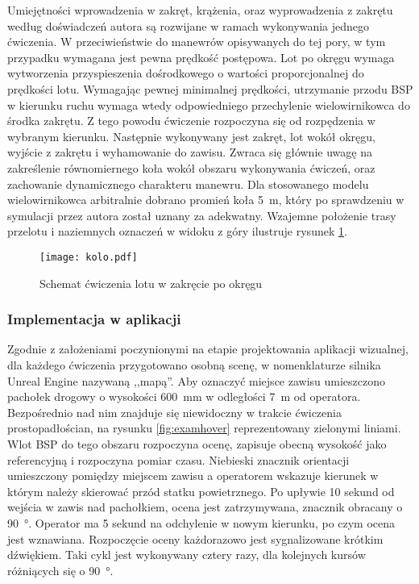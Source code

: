Umiejętności wprowadzenia w zakręt, krążenia, oraz wyprowadzenia z zakrętu według doświadczeń autora są rozwijane w ramach wykonywania jednego ćwiczenia. W przeciwieństwie do manewrów opisywanych do tej pory, w tym przypadku wymagana jest pewna prędkość postępowa. Lot po okręgu wymaga wytworzenia przyspieszenia dośrodkowego o wartości proporcjonalnej do prędkości lotu. Wymagając pewnej minimalnej prędkości, utrzymanie przodu BSP w kierunku ruchu wymaga wtedy odpowiedniego przechylenie wielowirnikowca do środka zakrętu. Z tego powodu ćwiczenie rozpoczyna się od rozpędzenia w wybranym kierunku. Następnie wykonywany jest zakręt, lot wokół okręgu, wyjście z zakrętu i wyhamowanie do zawisu. Zwraca się głównie uwagę na zakreślenie równomiernego koła wokół obszaru wykonywania ćwiczeń, oraz zachowanie dynamicznego charakteru manewru. Dla stosowanego modelu wielowirnikowca arbitralnie dobrano promień koła 5~m, który po sprawdzeniu w symulacji przez autora został uznany za adekwatny. Wzajemne położenie trasy przelotu i naziemnych oznaczeń w widoku z góry ilustruje rysunek \ref{fig:kolo}.

\begin{figure}[!h]
    \centering \texttt{[image: kolo.pdf]}
    \caption{Schemat ćwiczenia lotu w zakręcie po okręgu}
    \label{fig:kolo}
\end{figure}

\subsubsection{Implementacja w aplikacji}
Zgodnie z założeniami poczynionymi na etapie projektowania aplikacji wizualnej, dla każdego ćwiczenia przygotowano osobną scenę, w nomenklaturze silnika Unreal Engine nazywaną ,,mapą''. Aby oznaczyć miejsce zawisu umieszczono pachołek drogowy o wysokości 600~mm w odległości 7~m od operatora. Bezpośrednio nad nim znajduje się niewidoczny w trakcie ćwiczenia prostopadłościan, na rysunku \ref{fig:examhover} reprezentowany zielonymi liniami. Wlot BSP do tego obszaru rozpoczyna ocenę, zapisuje obecną wysokość jako referencyjną i rozpoczyna pomiar czasu. Niebieski znacznik orientacji umieszczony pomiędzy miejscem zawisu a operatorem wskazuje kierunek w którym należy skierować przód statku powietrznego. Po upływie 10 sekund od wejścia w zawis nad pachołkiem, ocena jest zatrzymywana, znacznik obracany o 90~°. Operator ma 5 sekund na odchylenie w nowym kierunku, po czym ocena jest wznawiana. Rozpoczęcie oceny każdorazowo jest sygnalizowane krótkim dźwiękiem. Taki cykl jest wykonywany cztery razy, dla kolejnych kursów różniących się o 90~°.

